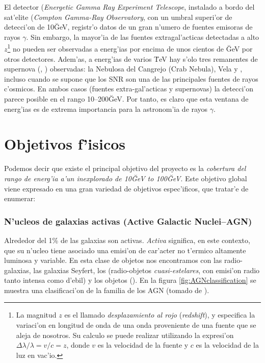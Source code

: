 El detector  (\emph{Energetic Gamma Ray Experiment
  Telescope}, instalado a bordo del sat'elite  (\emph{Compton
  Gamma-Ray Observatory}, con un umbral superi'or de detecci'on de
10\u{GeV}, registr'o datos de un gran n'umero de fuentes emisoras de
rayos $\gamma$. Sin embargo, la mayor'ia de las fuentes
extragal'acticas detectadas a alto %
%
$z$\footnote{La magnitud $z$ es el llamado \emph{desplazamiento al
    rojo} (\emph{redshift}), y especifica la variaci'on en longitud de
  onda de una onda proveniente de una fuente que se aleja de nosotros.
  Su calculo se puede realizar utilizando la expresi'on $\Delta\lambda/\lambda=v/c=z$,
  donde $v$ es la velocidad de la fuente y $c$ es la velocidad de la 
luz en vac'io.}%
%
no pueden ser observadas a energ'ias por encima de unos cientos de
\u{GeV} por otros detectores. Adem'as, a energ'ias de varios \u{TeV}
hay s'olo tres remanentes de supernova (\emph{}, ) observadas: la Nebulosa del Cangrejo
(Crab Nebula), Vela y \I{SN\,1006}, incluso cuando se supone que los
SNR son una de las principales fuentes de rayos c'osmicos. En ambos
casos (fuentes extra-gal'acticas y supernovas) la detecci'on parece
posible en el rango 10--200\u{GeV}. Por tanto, es claro que esta
ventana de energ'ias es de extrema importancia para la astronom'ia de
rayos $\gamma$.

\CGROenergiesfig

\section{Objetivos f'isicos}
%
Podemos decir que existe el principal objetivo del proyecto \MAGIC es
la \emph{cobertura del rango de energ'ia a'un inexplorado de 10\u{GeV}
  to 100\u{GeV}}. Este objetivo global viene expresado en una gran
variedad de objetivos espec'ificos, que tratar'e de enumerar:

\subsubsection*{N'ucleos de galaxias activas (Active Galactic 
Nuclei--AGN)}
%
Alrededor del 1\% de las galaxias son activas. \emph{Activa} significa,
en este contexto, que su n'ucleo tiene asociado una emisi'on de
car'acter no t'ermico altamente luminosa y variable.  En esta clase de
objetos nos encontramos con las radio-galaxias, las galaxias Seyfert,
los \emph{\I{cuasares}} (radio-objetos \emph{cuasi-estelares}, con
emisi'on radio tanto intensa como d'ebil) y los objetos
\emph{} (). En la figura
\ref{fig:AGNclassification} se muestra una clasificaci'on de la
familia de los AGN (tomado de \cite{Petry:tesis}).

